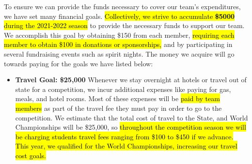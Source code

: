 To ensure we can provide the funds necessary to cover our team's expenditures, we have set many financial goals. \hl{Collectively, we strive to accumulate \textbf{\$5000} during the 2021-2022 season} to provide the necessary funds to support our team.  We accomplish this goal by obtaining \$150 from each member, \hl{requiring each member to obtain \$100 in donations or sponsorships,} and by participating in several fundraising events such as spirit nights. The money we acquire will go towards paying for the goals we have listed below:

\begin{itemize}
  \item \textbf{\Large Travel Goal: \$25,000 }
  \newline 
  Whenever we stay overnight at hotels or travel out of state for a competition, we incur additional expenses like paying for gas, meals, and hotel rooms. Most of these expenses will be \hl{paid by team members} as part of the travel fee they must pay in order to go to the competition. We estimate that the total cost of travel to the State, and World Championships will be \$25,000, so \hl{throughout the competition season we will be charging students travel fees ranging from \$100 to \$450 if we advance. This year, we qualified for the World Championships, increasing our travel cost goals.}
  

\end{itemize}
